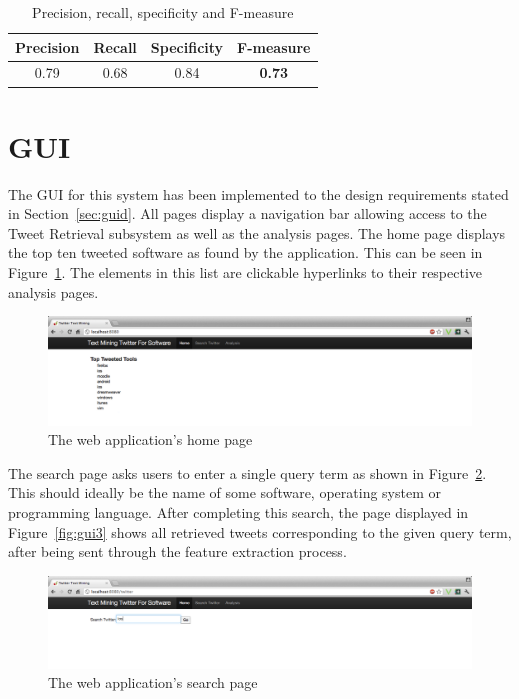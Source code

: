 \begin{table}[h]
\begin{center}
\begin{tabular}{|c|c|c|c|}\hline
Precision&Recall&Specificity&\textbf{F-measure}\\\hline
0.79&0.68&0.84&\textbf{0.73}\\\hline
\end{tabular}
\end{center}
\caption{Precision, recall, specificity and F-measure}
\label{tbl:measures}
\end{table}

\section{GUI}
The GUI for this system has been implemented to the design requirements stated in Section~\ref{sec:guid}. All pages display a navigation bar allowing access to the Tweet Retrieval subsystem as well as the analysis pages. The home page displays the top ten tweeted software as found by the application. This can be seen in Figure~\ref{fig:gui1}. The elements in this list are clickable hyperlinks to their respective analysis pages.

\begin{figure}[h]
\begin{center}
\includegraphics[width=15cm]{gui1}
\end{center}
\caption{The web application's home page}
\label{fig:gui1}
\end{figure}

The search page asks users to enter a single query term as shown in Figure~\ref{fig:gui2}. This should ideally be the name of some software, operating system or programming language. After completing this search, the page displayed in Figure~\ref{fig:gui3} shows all retrieved tweets corresponding to the given query term, after being sent through the feature extraction process.

\begin{figure}[h]
\begin{center}
\includegraphics[width=15cm]{gui2}
\end{center}
\caption{The web application's search page}
\label{fig:gui2}
\end{figure}

